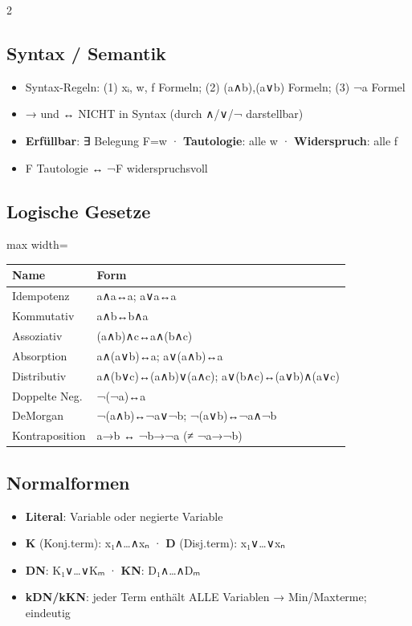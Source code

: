 \documentclass[10pt, a4paper]{article}
\begin{document}
\begin{multicols}{2}
\subsection{Syntax / Semantik}
\begin{itemize}
  \item Syntax-Regeln: (1) xᵢ, w, f Formeln; (2) (a∧b),(a∨b) Formeln; (3) ¬a Formel
  \item → und ↔ NICHT in Syntax (durch ∧/∨/¬ darstellbar)
  \item \textbf{Erfüllbar}: ∃ Belegung F=w · \textbf{Tautologie}: alle w · \textbf{Widerspruch}: alle f
  \item F Tautologie ↔ ¬F widerspruchsvoll
\end{itemize}


\subsection{Logische Gesetze}

{\small
\begin{adjustbox}{max width=\linewidth}
{\scriptsize
\begin{tabular}{ll}
\toprule
\textbf{Name} & \textbf{Form} \\
\midrule
Idempotenz & a∧a↔a; a∨a↔a \\
Kommutativ & a∧b↔b∧a \\
Assoziativ & (a∧b)∧c↔a∧(b∧c) \\
Absorption & a∧(a∨b)↔a; a∨(a∧b)↔a \\
Distributiv & a∧(b∨c)↔(a∧b)∨(a∧c); a∨(b∧c)↔(a∨b)∧(a∨c) \\
Doppelte Neg. & ¬(¬a)↔a \\
DeMorgan & ¬(a∧b)↔¬a∨¬b; ¬(a∨b)↔¬a∧¬b \\
Kontraposition & a→b ↔ ¬b→¬a (≠ ¬a→¬b) \\
\bottomrule
\end{tabular}
}
\end{adjustbox}
}



\subsection{Normalformen}
\begin{itemize}
  \item \textbf{Literal}: Variable oder negierte Variable
  \item \textbf{K} (Konj.term): x₁∧…∧xₙ · \textbf{D} (Disj.term): x₁∨…∨xₙ
  \item \textbf{DN}: K₁∨…∨Kₘ · \textbf{KN}: D₁∧…∧Dₘ
  \item \textbf{kDN/kKN}: jeder Term enthält ALLE Variablen → Min/Maxterme; eindeutig
\end{itemize}



\end{multicols}
\end{document}
